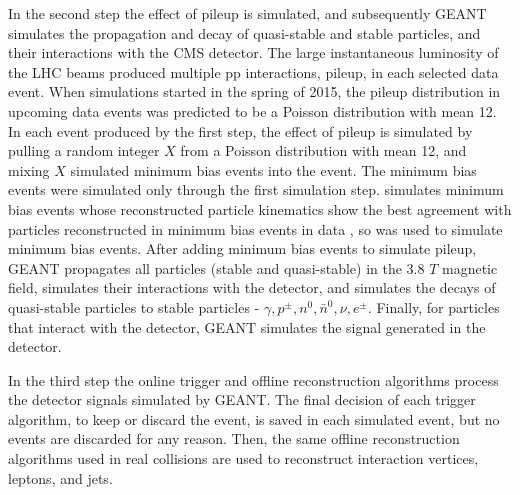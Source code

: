 
In the second step the effect of pileup is simulated, and subsequently GEANT \cite{geant4} simulates the propagation and decay of 
quasi-stable and stable particles, and their interactions with the CMS detector.  The large instantaneous luminosity of the LHC 
beams produced multiple pp interactions, pileup, in each selected data event.  When \MC simulations started in the spring of 2015, 
the pileup distribution in upcoming data events was predicted to be a Poisson distribution with mean 12.  In each event produced 
by the first step, the effect of pileup is simulated by pulling a 
random integer $X$ from a Poisson distribution with mean 12, and mixing $X$ simulated minimum bias events into the event.  The 
minimum bias events were simulated only through the first simulation step.  \PYTHIA simulates minimum bias events whose reconstructed 
particle kinematics show the best agreement with particles reconstructed in minimum bias events in data \cite{pythiaForHadronization}, 
so \PYTHIA was used to simulate minimum bias events.  After adding minimum bias events to simulate pileup, GEANT propagates all particles 
(stable and quasi-stable) in the 3.8 $\unit{T}$ magnetic field, simulates their interactions with the detector, and simulates the decays 
of quasi-stable particles to stable particles - $\gamma,p^{\pm},n^{0},\bar{n}^{0},\nu,e^{\pm}$.  Finally, for particles that interact 
with the detector, GEANT simulates the signal generated in the detector.

In the third step the online trigger and offline reconstruction algorithms process the detector signals simulated by GEANT.  The 
final decision of each trigger algorithm, to keep or discard the event, is saved in each simulated event, but no events are discarded 
for any reason.  Then, the same offline reconstruction algorithms used in real collisions are used to reconstruct interaction vertices, 
leptons, and jets.

